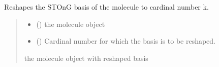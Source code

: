 \documentclass[letterpaper,10pt,english]{sphinxmanual}
\begin{document}
\begin{fulllineitems}
\label{\detokenize{api:MSTOOpt.BasisReshape}}
\pysigstartsignatures
\pysiglinewithargsret
{}
{\sphinxparamcomma {}}
{}
\pysigstopsignatures
\sphinxAtStartPar
Reshapes the STO\sphinxhyphen{}nG basis of the molecule to cardinal number k.
\begin{quote}\begin{description}
\begin{itemize}
\item {} 
\sphinxAtStartPar
{} () \textendash{} the  molecule object

\item {} 
\sphinxAtStartPar
{} () \textendash{} Cardinal number for which the basis is to be reshaped.

\end{itemize}

\sphinxAtStartPar
the  molecule object with reshaped basis

\sphinxAtStartPar
{}

\end{description}\end{quote}


\end{fulllineitems}
\end{document}
